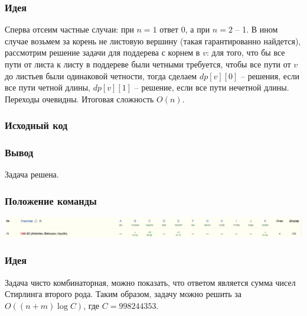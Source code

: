 
\subsubsection*{Идея}
Сперва отсеим частные случаи: при $n = 1$ ответ $0$, а при $n = 2$ -- 1. В ином случае возьмем за корень не листовую вершину (такая гарантированно найдется), рассмотрим решение задачи для поддерева с корнем в $v$: для того, что бы все пути от листа к листу в поддереве были четными требуется, чтобы все пути от $v$ до листьев были одинаковой четности, тогда сделаем $dp[v][0]$ -- решения, если все пути четной длины, $dp[v][1]$ -- решение, если все пути нечетной длины. Переходы очевидны. Итоговая сложность $O(n)$.
\subsubsection*{Исходный код}

\subsubsection*{Вывод}
Задача решена.
\subsubsection*{Положение команды}
\includegraphics[scale=0.25]{images/220206.png}\newline\noindent
\pagebreak


\subsubsection*{Идея}
Задача чисто комбинаторная, можно показать, что ответом является сумма чисел Стирлинга второго рода. Таким образом, задачу можно решить за $O((n + m)\log{C})$, где $C = 998244353$.
